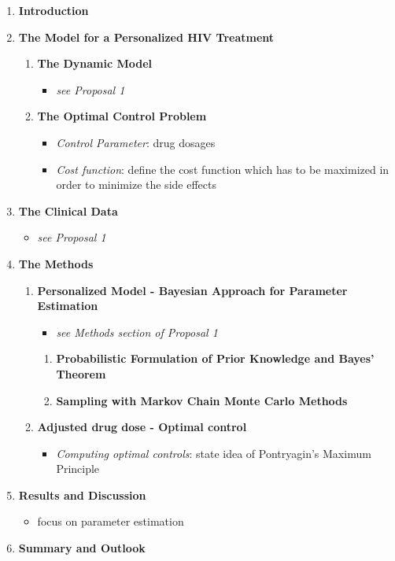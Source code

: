 \begin{enumerate}[font=\bfseries]
    \item \textbf{Introduction}
    \item \textbf{The Model for a Personalized HIV Treatment}
    \begin{enumerate}[font=\bfseries]
        \item \textbf{The Dynamic Model}
        \begin{itemize}[font=\small]
            \item \textit{see Proposal 1}
        \end{itemize}
        \item \textbf{The Optimal Control Problem}
        \begin{itemize}[font=\small]
            \item \textit{Control Parameter}: drug dosages
            \item \textit{Cost function}: define the cost function which has to be maximized in order to minimize the side effects
        \end{itemize}
    \end{enumerate}
    \item \textbf{The Clinical Data}
    \begin{itemize}[font=\small]
        \item \textit{see Proposal 1}
    \end{itemize}
    \item \textbf{The Methods}
    \begin{enumerate}[font=\bfseries]
        \item \textbf{Personalized Model - Bayesian Approach for Parameter Estimation}
        \begin{itemize}[font=\small]
            \item \textit{see Methods section of Proposal 1}
        \end{itemize}
        \begin{enumerate}[font=\bfseries]
            \item \textbf{Probabilistic Formulation of Prior Knowledge and Bayes' Theorem}
            \item \textbf{Sampling with Markov Chain Monte Carlo Methods}
        \end{enumerate}
        \item \textbf{Adjusted drug dose - Optimal control}
        \begin{itemize}[font=\small]
            \item \textit{Computing optimal controls}: state idea of Pontryagin's Maximum Principle
        \end{itemize}
    \end{enumerate}
    \item \textbf{Results and Discussion}
    \begin{itemize}[font=\small]
        \item focus on parameter estimation
    \end{itemize}
    \item \textbf{Summary and Outlook}
\end{enumerate}